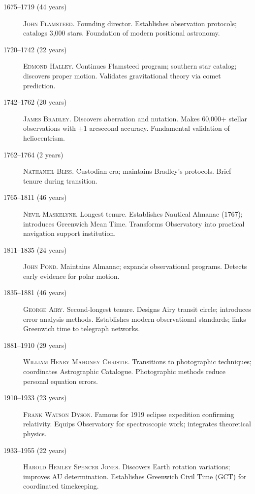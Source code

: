 \begin{description}
\item[1675--1719 (44 years)] \textsc{John Flamsteed}. Founding director. Establishes observation protocols; catalogs 3,000 stars. Foundation of modern positional astronomy.

\item[1720--1742 (22 years)] \textsc{Edmond Halley}. Continues Flamsteed program; southern star catalog; discovers proper motion. Validates gravitational theory via comet prediction.

\item[1742--1762 (20 years)] \textsc{James Bradley}. Discovers aberration and nutation. Makes 60,000+ stellar observations with $\pm 1$ arcsecond accuracy. Fundamental validation of heliocentrism.

\item[1762--1764 (2 years)] \textsc{Nathaniel Bliss}. Custodian era; maintains Bradley's protocols. Brief tenure during transition.

\item[1765--1811 (46 years)] \textsc{Nevil Maskelyne}. Longest tenure. Establishes Nautical Almanac (1767); introduces Greenwich Mean Time. Transforms Observatory into practical navigation support institution.

\item[1811--1835 (24 years)] \textsc{John Pond}. Maintains Almanac; expands observational programs. Detects early evidence for polar motion.

\item[1835--1881 (46 years)] \textsc{George Airy}. Second-longest tenure. Designs Airy transit circle; introduces error analysis methods. Establishes modern observational standards; links Greenwich time to telegraph networks.

\item[1881--1910 (29 years)] \textsc{William Henry Mahoney Christie}. Transitions to photographic techniques; coordinates Astrographic Catalogue. Photographic methods reduce personal equation errors.

\item[1910--1933 (23 years)] \textsc{Frank Watson Dyson}. Famous for 1919 eclipse expedition confirming relativity. Equips Observatory for spectroscopic work; integrates theoretical physics.

\item[1933--1955 (22 years)] \textsc{Harold Hemley Spencer Jones}. Discovers Earth rotation variations; improves AU determination. Establishes Greenwich Civil Time (GCT) for coordinated timekeeping.


\end{description}

